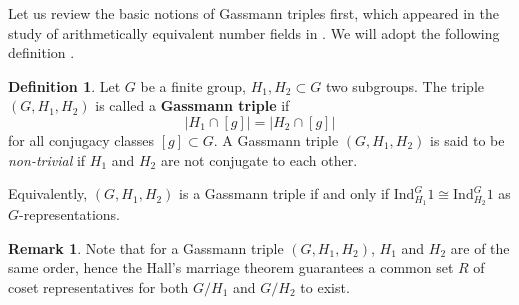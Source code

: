 \documentclass[aps,twocolumn,prx,floatfix,preprintnumbers, nofootinbib,10pt]{revtex4-2}
\numberwithin{equation}{section}
\theoremstyle{definition}
\newtheorem{definition}[theorem]{Definition}
\newtheorem{remark}[theorem]{\bf Remark}
\newcommand{\be}{\begin{equation}}
\newcommand{\ee}{\end{equation}}
\newcommand{\Ind}{\text{Ind}}
\begin{document}
Let us review the basic notions of Gassmann triples first, which appeared in the study of arithmetically equivalent number fields in \cite{Gassmann:1926}. We will adopt the following definition \cite{Sunada1985RiemannianCA}.

\begin{definition}
    \label{def:GassmannTriple}
    Let $G$ be a finite group, $H_1,H_2\subset G$ two subgroups. The triple $(G, H_1, H_2)$ is called a \textbf{Gassmann triple} if 
    \be
        |H_1\cap [g]|=|H_2\cap [g]|
    \ee
    for all conjugacy classes $[g]\subset G$. A Gassmann triple $(G,H_1,H_2)$ is said to be \emph{non-trivial} if $H_1$ and $H_2$ are not conjugate to each other. 
\end{definition}
Equivalently, $(G, H_1, H_2)$ is a Gassmann triple if and only if $\Ind^G_{H_1}1\cong \Ind^G_{H_2}1$ as $G$-representations.
\begin{remark}
\label{rmk:Hallsmarriage}
    Note that for a Gassmann triple $(G,H_1,H_2)$, $H_1$ and $H_2$ are of the same order, hence the Hall's marriage theorem \cite{hall_combinatorial_1998} guarantees a common set $R$ of coset representatives for both $G/H_1$ and $G/H_2$ to exist.
\end{remark}
\end{document}
